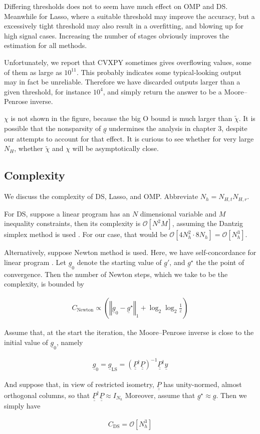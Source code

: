 \documentclass[journal]{IEEEtran}
\newcommand {\e} {\varepsilon}
\newcommand {\D} {\cdot}
\newcommand {\m} [1] {\( #1 \)}
\newcommand {\V} [1] {\underline {#1}}
\newcommand {\M} [1] {\underline {\underline {#1}}}
\newcommand {\RB} [1] {\left( #1 \right)}
\newcommand {\SB} [1] {\left[ #1 \right]}
\newcommand {\VNm} [1] {\left \Vert #1 \right \Vert}
\newcommand {\Disp} [1] {
   \begin {align*}
      #1
   \end {align*}
}
\begin{document}
{Differing thresholds does not to seem have much effect on OMP and DS.
Meanwhile for Lasso, where a suitable threshold may improve the accuracy, but a excessively tight threshold may also result in a overfitting, and blowing up for high signal cases.
Increasing the number of stages obviously improves the estimation for all methods.

Unfortunately, we report that CVXPY sometimes gives overflowing values, some of them as large as \m {10^{11}}.
This probably indicates some typical-looking output may in fact be unreliable.
Therefore we have discarded outputs larger than a given threshold, for instance \m {10^4}, and simply return the answer to be a Moore–Penrose inverse.

\m {\chi} is not shown in the figure, because the big O bound is much larger than \m {\tilde {\chi}}.
It is possible that the nonsparsity of \m {\V {g}} undermines the analysis in chapter 3, despite our attempts to account for that effect.
It is curious to see whether for very large \m {N_H}, whether \m {\tilde {\chi}} and \m {\chi} will be asymptotically close.

\subsection {Complexity}

We discuss the complexity of DS, Lasso, and OMP.
Abbreviate \m {N_h = N_{H,t} N_{H,r}}.

For DS, suppose a linear program has an \m {N} dimensional variable and \m {M} inequality constraints, then its complexity is \m {\mathcal {O} \SB {N^2 M}}, assuming the Dantzig simplex method is used \cite {BoV04}.
For our case, that would be \m {\mathcal {O} \SB {4 N_h ^2 \D 8 N_h} = \mathcal {O} \SB {N_h ^3}}.

Alternatively, suppose Newton method is used.
Here, we have self-concordance for linear program \cite {BoV04}.
Let \m {\V {g} _0} denote the starting value of \m {\V {g}'}, and \m {\V {g} ^{\star}} the the point of convergence.
Then the number of Newton steps, which we take to be the complexity, is bounded by \cite {BoV04}
\Disp {
C_{\mathrm {Newton}}
\propto \RB {\VNm {\V {g}_0 -\V {g} ^{\star}}_1
+ \log_2 \log_2 \frac {1} {\e}}
}

Assume that, at the start the iteration, the Moore–Penrose inverse is close to the initial value of \m {\V {g}_0}, namely
%
\Disp {
\V {g}_0
=\V {g}_{\mathrm {LS}}
= \RB {\M {P} ^\dagger \M {P}} ^{-1} \M {P} ^\dagger \V {y} 
}
And suppose that, in view of restricted isometry, \m {\M {P}} has unity-normed, almost orthogonal columns, so that
\m {\M {P} ^\dagger \M {P} \approx I _{N_h}}
Moreover, assume that \m {\V {g} ^\star \approx \V {g}}.
Then we simply have
\Disp {
C_{\mathrm {DS}}
=\mathcal {O} \SB {N_h ^3} 
}

}
\end{document}
